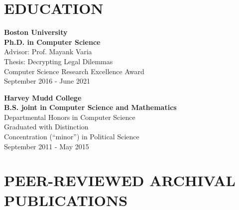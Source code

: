 \documentclass{res}
\begin{document}
\begin{resume}
\section{EDUCATION}  
\vspace{0.1in}

    \textbf{Boston University} \\
    \textbf{Ph.D. in Computer Science} \\
    Advisor: Prof. Mayank Varia \\
    Thesis: Decrypting Legal Dilemmas \\
    Computer Science Research Excellence Award \\
    September 2016 - June 2021

    \textbf{Harvey Mudd College} \\
    \textbf{B.S. joint in Computer Science and Mathematics}  \\
    Departmental Honors in Computer Science \\
    Graduated with Distinction \\
    Concentration (``minor'') in Political Science \\
    September 2011 - May 2015

\section{PEER-REVIEWED ARCHIVAL PUBLICATIONS}
\vspace{0.25in}

\setcounter{citctr}{1}
\edef\ageverifwebexperiment{[\arabic{citctr}]}
\edef\architecturematters{[\arabic{citctr}]}
\edef\adequatetailoring{[\arabic{citctr}]}
\edef\fraudethics{[\arabic{citctr}]}
\edef\eeegroup{[\arabic{citctr}]}
\edef\csamimprovements{[\arabic{citctr}]}
\edef\eeesok{[\arabic{citctr}]}
\edef\foregoneVerif{[\arabic{citctr}]}
\edef\copyrightMDL{[\arabic{citctr}]}
\edef\turboikos{[\arabic{citctr}]}
\edef\booligero{[\arabic{citctr}]}
\edef\foregoneconclusion{[\arabic{citctr}]}
\edef\AEC{[\arabic{citctr}]}
\edef\pullingblocksJIP{[\arabic{citctr}]}
\edef\devicefingerprinting{[\arabic{citctr}]}
\edef\pullingblocks{[\arabic{citctr}]}
\edef\fairsibility{[\arabic{citctr}]}
\edef\emailspam{[\arabic{citctr}]}



\end{resume}
\end{document}
